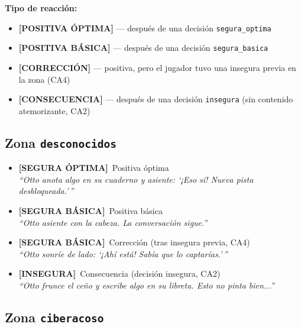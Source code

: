 \documentclass[12pt,a4paper]{article}
\newcommand{\segoptima}[1]{\item[\textcolor{segura}{$\bullet$}] \textcolor{segura}{\textbf{[SEGURA ÓPTIMA]}~#1}}
\newcommand{\segbasica}[1]{\item[\textcolor{basica}{$\bullet$}] \textcolor{basica}{\textbf{[SEGURA BÁSICA]}~#1}}
\newcommand{\inseg}[1]{\item[\textcolor{insegura}{$\bullet$}] \textcolor{insegura}{\textbf{[INSEGURA]}~#1}}
\begin{document}
\medskip
\noindent\textbf{Tipo de reacción:}

\begin{itemize}
  \item \textcolor{segura}{\textbf{[POSITIVA ÓPTIMA]}} --- después de una decisión \texttt{segura\_optima}
  \item \textcolor{basica}{\textbf{[POSITIVA BÁSICA]}} --- después de una decisión \texttt{segura\_basica}
  \item \textcolor{basica}{\textbf{[CORRECCIÓN]}} --- positiva, pero el jugador tuvo una insegura previa en la zona (CA4)
  \item \textcolor{insegura}{\textbf{[CONSECUENCIA]}} --- después de una decisión \texttt{insegura} (sin contenido atemorizante, CA2)
\end{itemize}

\subsection{Zona \texttt{desconocidos}}

\begin{itemize}[leftmargin=1.5cm]
  \segoptima{Positiva óptima}\\
  \textit{``Otto anota algo en su cuaderno y asiente: `¡Eso sí! Nueva pista desbloqueada.'\,''}

  \segbasica{Positiva básica}\\
  \textit{``Otto asiente con la cabeza. La conversación sigue.''}

  \segbasica{Corrección (tras insegura previa, CA4)}\\
  \textit{``Otto sonríe de lado: `¡Ahí está! Sabía que lo captarías.'\,''}

  \inseg{Consecuencia (decisión insegura, CA2)}\\
  \textit{``Otto frunce el ceño y escribe algo en su libreta. Esto no pinta bien...''}
\end{itemize}

\subsection{Zona \texttt{ciberacoso}}
\end{document}
